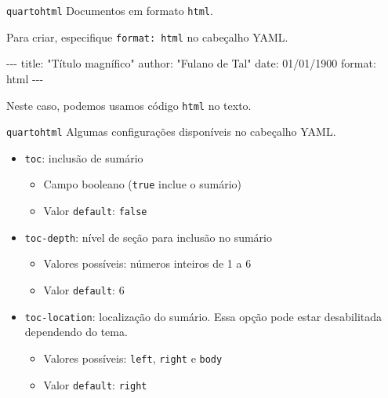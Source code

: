 \documentclass[
  10pt,
  ignorenonframetext,
]{beamer}
\newenvironment{Shaded}{\begin{snugshade}}{\end{snugshade}}
\newcommand{\AttributeTok}[1]{\textcolor[rgb]{0.40,0.45,0.13}{#1}}
\newcommand{\FunctionTok}[1]{\textcolor[rgb]{0.28,0.35,0.67}{#1}}
\newcommand{\KeywordTok}[1]{\textcolor[rgb]{0.00,0.23,0.31}{#1}}
\newcommand{\PreprocessorTok}[1]{\textcolor[rgb]{0.68,0.00,0.00}{#1}}
\newcommand{\StringTok}[1]{\textcolor[rgb]{0.13,0.47,0.30}{#1}}
\providecommand{\tightlist}{%
  \setlength{\itemsep}{0pt}\setlength{\parskip}{0pt}}\usepackage{longtable,booktabs,array}
\begin{document}
\begin{frame}[fragile]{\texttt{quarto}\newline \texttt{html}}
\protect\hypertarget{quartohtml}{}
Documentos em formato \texttt{html}.

Para criar, especifique \texttt{format:\ html} no cabeçalho YAML.

\begin{Shaded}
\begin{Highlighting}[]
\PreprocessorTok{{-}{-}{-}}
\FunctionTok{title}\KeywordTok{:}\AttributeTok{ }\StringTok{"Título magnífico"}
\FunctionTok{author}\KeywordTok{:}\AttributeTok{ }\StringTok{"Fulano de Tal"}
\FunctionTok{date}\KeywordTok{:}\AttributeTok{ 01/01/1900}
\FunctionTok{format}\KeywordTok{:}\AttributeTok{ html}
\PreprocessorTok{{-}{-}{-}}
\end{Highlighting}
\end{Shaded}

\colorbox{cabecalho}{\textcolor{titulo}{Neste caso, podemos usamos código \texttt{html} no texto.}}
\end{frame}

\begin{frame}[fragile]{\texttt{quarto}\newline \texttt{html}}
\protect\hypertarget{quartohtml-1}{}
Algumas configurações disponíveis no cabeçalho YAML.

\begin{itemize}
\tightlist
\item
  \texttt{toc}: inclusão de sumário

  \begin{itemize}
  \tightlist
  \item
    Campo booleano (\texttt{true} inclue o sumário)
  \item
    Valor \texttt{default}: \texttt{false}
  \end{itemize}
\item
  \texttt{toc-depth}: nível de seção para inclusão no sumário

  \begin{itemize}
  \tightlist
  \item
    Valores possíveis: números inteiros de 1 a 6
  \item
    Valor \texttt{default}: 6
  \end{itemize}
\item
  \texttt{toc-location}: localização do sumário. Essa opção pode estar
  desabilitada dependendo do tema.

  \begin{itemize}
  \tightlist
  \item
    Valores possíveis: \texttt{left}, \texttt{right} e \texttt{body}
  \item
    Valor \texttt{default}: \texttt{right}
  \end{itemize}
\end{itemize}
\end{frame}
\end{document}
